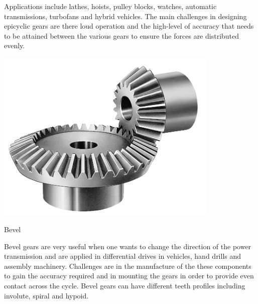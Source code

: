 Applications include lathes, hoists, pulley blocks, watches, automatic transmissions, turbofans and hybrid vehicles. The main challenges in designing epicyclic gears are there loud operation and the high-level of accuracy that needs to be attained between the various gears to ensure the forces are distributed evenly.

\begin{marginfigure}
  \centering
  \includegraphics[width=0.8\textwidth]{figs/bevel.png}
  \caption{Bevel}
\end{marginfigure}
Bevel gears are very useful when one wants to change the direction of the power transmission and are applied in differential drives in vehicles, hand drills and assembly machinery. Challenges are in the manufacture of the these components to gain the accuracy required and in mounting the gears in order to provide even contact across the cycle. Bevel gears can have different teeth profiles including involute, spiral and hypoid.

